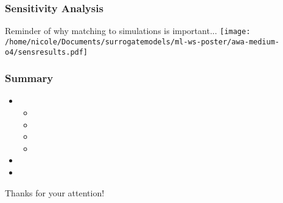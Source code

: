 \documentclass[professionalfonts,t]{beamer}
\begin{document}
\begin{frame}
\frametitle{Sensitivity Analysis}

\vspace{-0.5em}
Reminder of why matching to simulations is important...
\centering
\texttt{[image: /home/nicole/Documents/surrogatemodels/ml-ws-poster/awa-medium-o4/sensresults.pdf]}
\end{frame}
\begin{frame}
	\frametitle{Summary}
	\begin{itemize}
		\item 
		\begin{itemize}
			\item 
			\item 
			\item 
			\item 

		\end{itemize}
		\item 
		\item 
		
	\end{itemize}

	\vspace{1em}
	\centering
	\color{blue}\huge{Thanks for your attention!}

\end{frame}

\end{document}
